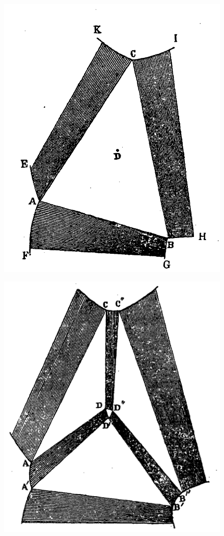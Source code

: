 \documentclass[12pt]{article}
\begin{document}
\begin{figure}[h]
\centering
\begin{minipage}{.3\textwidth}
  \centering
  \includegraphics[width=\linewidth]{fig_2}
  \label{fig_2}
\end{minipage}%
\begin{minipage}{.3\textwidth}
  \centering
  \includegraphics[width=\linewidth]{fig_3}

\end{minipage}
\end{figure}
\end{document}
